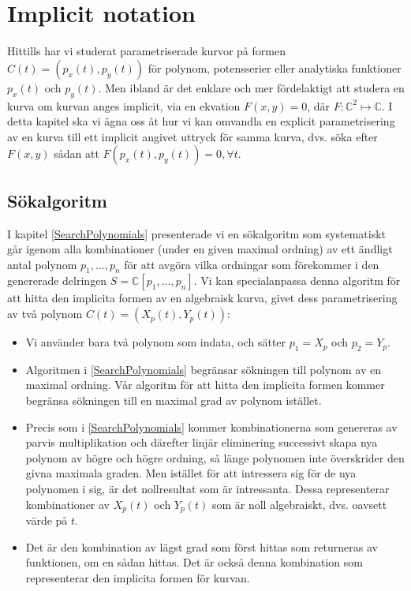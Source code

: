 \chapter{Implicit notation}

Hittills har vi studerat parametriserade kurvor på formen $C(t)=(p_x(t),p_y(t))$ för polynom, potensserier eller analytiska funktioner $p_x(t)$ och $p_y(t)$. Men ibland är det enklare och mer fördelaktigt att studera en kurva om kurvan anges implicit, via en ekvation $F(x,y)=0$, där $F: \mathbb{C}^2 \mapsto \mathbb{C}$. I detta kapitel ska vi ägna oss åt hur vi kan omvandla en explicit parametrisering av en kurva till ett implicit angivet uttryck för samma kurva, dvs. söka efter $F(x,y)$ sådan att $F(p_x(t),p_y(t))=0,\forall t$.

\section{Sökalgoritm}

I kapitel \ref{SearchPolynomials} presenterade vi en sökalgoritm som systematiskt går igenom alla kombinationer (under en given maximal ordning) av ett ändligt antal polynom $p_1,\ldots,p_n$ för att avgöra vilka ordningar som förekommer i den genererade delringen $S=\mathbb{C}\left[p_1,\ldots,p_n\right]$. Vi kan specialanpassa denna algoritm för att hitta den implicita formen av en algebraisk kurva, givet dess parametrisering av två polynom $C(t)=\left(X_p(t),Y_p(t)\right)$:

\begin{itemize}
\item Vi använder bara två polynom som indata, och sätter $p_1=X_p$ och $p_2=Y_p$.

\item Algoritmen i \ref{SearchPolynomials} begränsar sökningen till polynom av en maximal ordning. Vår algoritm för att hitta den implicita formen kommer begränsa sökningen till en maximal grad av polynom istället.

\item Precis som i \ref{SearchPolynomials} kommer kombinationerna som genereras av parvis multiplikation och därefter linjär eliminering successivt skapa nya polynom av högre och högre ordning, så länge polynomen inte överskrider den givna maximala graden. Men istället för att intressera sig för de nya polynomen i sig, är det nollresultat som är intressanta. Dessa representerar kombinationer av $X_p(t)$ och $Y_p(t)$ som är noll algebraiskt, dvs. oavsett värde på $t$.

\item Det är den kombination av lägst grad som först hittas som returneras av funktionen, om en sådan hittas. Det är också denna kombination som representerar den implicita formen för kurvan.
\end{itemize}

